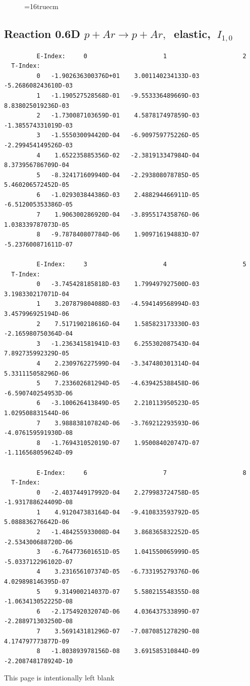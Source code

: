 \documentclass[12pt,dvips]{article}
\begin{document}
\begin{figure} \label{0.6T}
\epsfxsize=16truecm
\end{figure}
\newpage

\subsection{
Reaction 0.6D  $p + Ar \rightarrow p + Ar ,\ $
 elastic, $\  I_{1,0}$
}

\begin{small}\begin{verbatim}
         E-Index:     0                     1                     2
  T-Index:
         0   -1.902636300376D+01    3.001140234133D-03   -5.268608243610D-03
         1   -1.190527528568D-01   -9.553336489669D-03    8.838025019236D-03
         2   -1.730087103659D-01    4.587817497859D-03   -1.385574331019D-03
         3   -1.555030094420D-04   -6.909759775226D-05   -2.299454149526D-03
         4    1.652235885356D-02   -2.381913347984D-04    8.373956786709D-04
         5   -8.324171609940D-04   -2.293808078785D-05    5.460206572452D-05
         6   -1.029303844386D-03    2.488294466911D-05   -6.512005353386D-05
         7    1.906300286920D-04   -3.895517435876D-06    1.038339787073D-05
         8   -9.787840807784D-06    1.909716194883D-07   -5.237600871611D-07

         E-Index:     3                     4                     5
  T-Index:
         0   -3.745428185818D-03    1.799497927500D-03    3.198330217071D-04
         1    3.207879804088D-03   -4.594149568994D-03    3.457996925194D-06
         2    7.517190218616D-04    1.585823173330D-03   -2.165980750364D-04
         3   -1.236341581941D-03    6.255302087543D-04    7.892735992329D-05
         4    2.230976227599D-04   -3.347480301314D-04    5.331115058296D-06
         5    7.233602681294D-05   -4.639425388458D-06   -6.590740254953D-06
         6   -3.100626413849D-05    2.210113950523D-05    1.029508831544D-06
         7    3.988838107824D-06   -3.769212293593D-06   -4.076159591930D-08
         8   -1.769431052019D-07    1.950084020747D-07   -1.116568059624D-09

         E-Index:     6                     7                     8
  T-Index:
         0   -2.403744917992D-04    2.279983724758D-05   -1.931788624409D-08
         1    4.912047383164D-04   -9.410833593792D-05    5.088836276642D-06
         2   -1.484255933008D-04    3.868365832252D-05   -2.534300688720D-06
         3   -6.764773601651D-05    1.041550065999D-05   -5.033712296102D-07
         4    3.231656107374D-05   -6.733195279376D-06    4.029898146395D-07
         5    9.314900214037D-07    5.580215548355D-08   -1.063413052225D-08
         6   -2.175492032074D-06    4.036437533899D-07   -2.288971303250D-08
         7    3.569143181296D-07   -7.087085127829D-08    4.174797773877D-09
         8   -1.803893978156D-08    3.691585310844D-09   -2.208748178924D-10

\end{verbatim}\end{small}
\newpage
This page is intentionally left blank
\newpage
\end{document}
